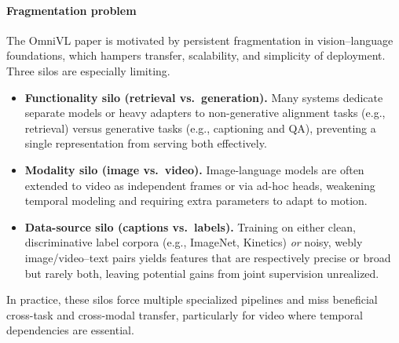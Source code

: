 \begin{enrichment}
\begin{enrichment}
        \paragraph{Fragmentation problem}
        The OmniVL paper \cite{wang2022_omnivl} is motivated by persistent fragmentation in vision–language foundations, which hampers transfer, scalability, and simplicity of deployment. Three silos are especially limiting.
        \begin{itemize}
            \item \textbf{Functionality silo (retrieval vs.\ generation).} Many systems dedicate separate models or heavy adapters to non-generative alignment tasks (e.g., retrieval) versus generative tasks (e.g., captioning and QA), preventing a single representation from serving both effectively.
            \item \textbf{Modality silo (image vs.\ video).} Image-language models are often extended to video as independent frames or via ad-hoc heads, weakening temporal modeling and requiring extra parameters to adapt to motion.
            \item \textbf{Data-source silo (captions vs.\ labels).} Training on either clean, discriminative label corpora (e.g., ImageNet, Kinetics) \emph{or} noisy, webly image/video–text pairs yields features that are respectively precise or broad but rarely both, leaving potential gains from joint supervision unrealized.
        \end{itemize}
        In practice, these silos force multiple specialized pipelines and miss beneficial cross-task and cross-modal transfer, particularly for video where temporal dependencies are essential.
        

\end{enrichment}
\end{enrichment}
